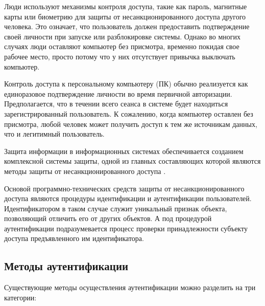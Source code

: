 \documentclass[12pt]{article}
\begin{document}
    \par Люди используют механизмы контроля доступа, такие как пароль, магнитные карты или биометрию для защиты от несанкционированного доступа другого человека. Это означает, что пользователь должен предоставить подтверждение своей личности при запуске или разблокировке системы. Однако во многих случаях люди оставляют компьютер без присмотра, временно покидая свое рабочее место, просто потому что у них отсутствует привычка выключать компьютер.

    \par Контроль доступа к персональному компьютеру (ПК) обычно реализуется как единоразовое подтверждение личности во время первичной авторизации. Предполагается, что в течении всего сеанса в системе будет находиться зарегистрированный пользователь. К сожалению, когда компьютер оставлен без присмотра, любой человек может получить доступ к тем же источникам данных, что и легитимный пользователь.

    \par Защита информации в информационных системах обеспечивается созданием комплексной системы защиты, одной из главных составляющих которой являются методы защиты от несанкционированного доступа \cite{BiometricRecognition, BiometricSystem}.

    \par Основой программно-технических средств защиты от несанкционированного доступа являются процедуры идентификации и аутентификации пользователей. Идентификатором в таком случае служит уникальный признак объекта, позволяющий отличить его от других объектов. А под процедурой аутентификации подразумевается процесс проверки принадлежности субъекту доступа предъявленного им идентификатора.


    \subsection{Методы аутентификации}
    \label{sec:Intro:ApplicationArea:AuthenticationMethods}

    \par Существующие методы осуществления аутентификации можно разделить на три категории:
\end{document}
